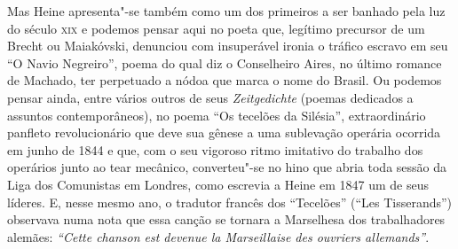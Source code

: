 Mas Heine apresenta"-se também como um dos primeiros a ser banhado pela
luz do século \textsc{xix} e podemos pensar aqui no poeta que, legítimo
precursor de um Brecht ou Maiakóvski, denunciou com insuperável ironia
o tráfico escravo em seu “O Navio Negreiro”, poema do qual diz o
Conselheiro Aires, no último romance de Machado, ter perpetuado a nódoa
que marca o nome do Brasil. Ou podemos pensar ainda, entre vários
outros de seus \textit{Zeitgedichte} (poemas dedicados a assuntos
contemporâneos), no poema “Os tecelões da Silésia”, extraordinário
panfleto revolucionário que deve sua gênese a uma sublevação operária
ocorrida em junho de 1844 e que, com o seu vigoroso ritmo imitativo do
trabalho dos operários junto ao tear mecânico, converteu"-se no hino
que abria toda sessão da Liga dos Comunistas em Londres, como escrevia
a Heine em 1847 um de seus líderes. E, nesse mesmo ano, o tradutor
francês dos “Tecelões” (“Les Tisserands”) observava numa nota
que essa canção se tornara a Marselhesa dos trabalhadores alemães:
\textit{``Cette chanson est devenue la Marseillaise des ouvriers
allemands''}.

